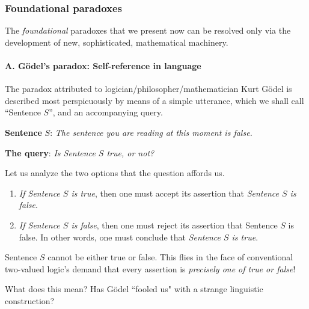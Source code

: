 \subsubsection{Foundational paradoxes}
\label{sec:paradoxes}

The {\em foundational} paradoxes that we present now can be resolved only via the development of new, sophisticated, mathematical machinery.

\paragraph{A.  G\"{o}del's paradox: Self-reference in language}

 

The paradox attributed to logician/philosopher/mathematician Kurt G\"{o}del is described most perspicuously by means of a simple utterance, which we shall call ``Sentence $S$'', and an accompanying query.

\medskip

\noindent
{\bf Sentence} $S$:  {\em The sentence you are reading at this moment is false.}

\smallskip

\noindent
{\bf The query}: {\it Is Sentence $S$ true, or not?}

\bigskip

\noindent
Let us analyze the two options that the question affords us.
\begin{enumerate}
\item
{\em If Sentence $S$ is true}, then one must accept its assertion that {\it Sentence $S$ is false}.

\medskip\item
{\em If Sentence $S$ is false}, then one must reject its assertion that Sentence $S$ is false.  In other words, one must conclude that {\it Sentence $S$ is true}.
\end{enumerate}

\medskip

\noindent
Sentence $S$ cannot be either true or false.  This flies in the face of conventional two-valued logic's demand that every assertion is {\em precisely one of {\em true} or {\em false}}!

\bigskip

\noindent
What does this mean?  Has G\"{o}del ``fooled us" with a strange linguistic construction?

\smallskip

